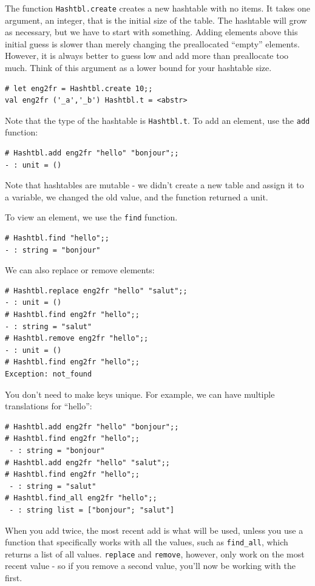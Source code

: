 \documentclass[10pt]{book}
\begin{document}
{The function {\tt Hashtbl.create} creates a new hashtable with no items.
It takes one argument, an integer, that is the initial size of the table.
The hashtable will grow as necessary, but we have to start with something.
Adding elements above this initial guess is slower than merely
changing the preallocated ``empty'' elements. However, it is always better
to guess low and add more than preallocate too much. Think of this argument 
as a lower bound for your hashtable size.

\beforeverb
\begin{verbatim}
# let eng2fr = Hashtbl.create 10;;
val eng2fr ('_a','_b') Hashtbl.t = <abstr>
\end{verbatim}
\afterverb

Note that the type of the hashtable is {\tt Hashtbl.t}. To add an element, use the 
{\tt add} function:

\beforeverb
\begin{verbatim}
# Hashtbl.add eng2fr "hello" "bonjour";;
- : unit = ()
\end{verbatim}
\afterverb

Note that hashtables are mutable - we didn't create a new table and assign it to 
a variable, we changed the old value, and the function returned a unit.

To view an element, we use the {\tt find} function.

\beforeverb
\begin{verbatim}
# Hashtbl.find "hello";;
- : string = "bonjour"
\end{verbatim}
\afterverb

We can also replace or remove elements:

\beforeverb
\begin{verbatim}
# Hashtbl.replace eng2fr "hello" "salut";;
- : unit = ()
# Hashtbl.find eng2fr "hello";;
- : string = "salut"
# Hashtbl.remove eng2fr "hello";;
- : unit = ()
# Hashtbl.find eng2fr "hello";;
Exception: not_found
\end{verbatim}
\afterverb

You don't need to make keys unique. For example, we can have
multiple translations for ``hello'':

\beforeverb
\begin{verbatim}
# Hashtbl.add eng2fr "hello" "bonjour";;
# Hashtbl.find eng2fr "hello";;
 - : string = "bonjour"
# Hashtbl.add eng2fr "hello" "salut";;
# Hashtbl.find eng2fr "hello";;
 - : string = "salut"
# Hashtbl.find_all eng2fr "hello";;
 - : string list = ["bonjour"; "salut"]
\end{verbatim}
\afterverb
When you add twice, the most recent add is what will be used, unless
you use a function that specifically works with all the values, such 
as {\tt \verb"find_all"}, which returns a list of all values. {\tt replace} 
and {\tt remove}, however, only work on the most recent value - so
if you remove a second value, you'll now be working with the first.

}
\end{document}

